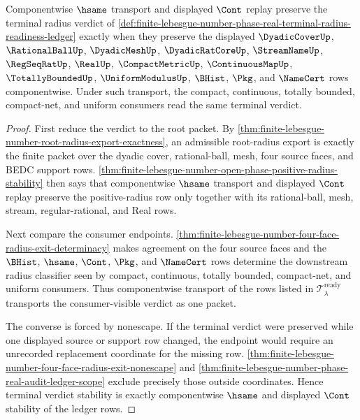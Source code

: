 \begin{theorem}
\label{thm:finite-lebesgue-number-phase-real-terminal-radius-stability}
Componentwise $\hsame$ transport and displayed $\Cont$ replay preserve the terminal radius verdict of \autoref{def:finite-lebesgue-number-phase-real-terminal-radius-readiness-ledger} exactly when they preserve the displayed $\DyadicCoverUp$, $\RationalBallUp$, $\DyadicMeshUp$, $\DyadicRatCoreUp$, $\StreamNameUp$, $\RegSeqRatUp$, $\RealUp$, $\CompactMetricUp$, $\ContinuousMapUp$, $\TotallyBoundedUp$, $\UniformModulusUp$, $\BHist$, $\Pkg$, and $\NameCert$ rows componentwise. Under such transport, the compact, continuous, totally bounded, compact-net, and uniform consumers read the same terminal verdict.
\end{theorem}
\begin{proof}
First reduce the verdict to the root packet. By \autoref{thm:finite-lebesgue-number-root-radius-export-exactness}, an admissible root-radius export is exactly the finite packet over the dyadic cover, rational-ball, mesh, four source faces, and BEDC support rows. \autoref{thm:finite-lebesgue-number-open-phase-positive-radius-stability} then says that componentwise $\hsame$ transport and displayed $\Cont$ replay preserve the positive-radius row only together with its rational-ball, mesh, stream, regular-rational, and Real rows.

Next compare the consumer endpoints. \autoref{thm:finite-lebesgue-number-four-face-radius-exit-determinacy} makes agreement on the four source faces and the $\BHist$, $\hsame$, $\Cont$, $\Pkg$, and $\NameCert$ rows determine the downstream radius classifier seen by compact, continuous, totally bounded, compact-net, and uniform consumers. Thus componentwise transport of the rows listed in $\mathcal{T}_{\lambda}^{\mathrm{ready}}$ transports the consumer-visible verdict as one packet.

The converse is forced by nonescape. If the terminal verdict were preserved while one displayed source or support row changed, the endpoint would require an unrecorded replacement coordinate for the missing row. \autoref{thm:finite-lebesgue-number-four-face-radius-exit-nonescape} and \autoref{thm:finite-lebesgue-number-phase-real-audit-ledger-scope} exclude precisely those outside coordinates. Hence terminal verdict stability is exactly componentwise $\hsame$ and displayed $\Cont$ stability of the ledger rows.
\end{proof}


